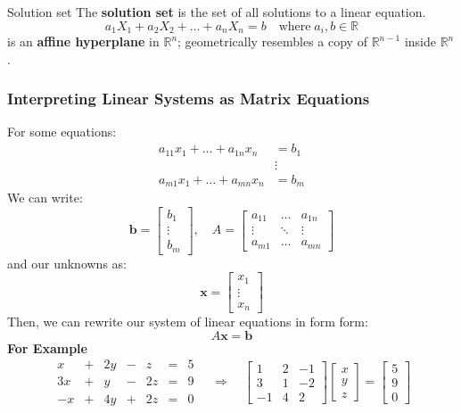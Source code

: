\documentclass[a4paper, 9pt]{extarticle}
\begin{document}
\begin{definitionbox}{Solution set}{}
  The \textbf{solution set} is the set of all solutions to a linear equation.
  $$a_1X_1 + a_2X_2 + \ldots + a_nX_n = b \quad \text{where} \; a_i, b \in \mathbb{R}$$
  is an \textbf{affine hyperplane} in $\mathbb{R}^n$; geometrically resembles a copy of $\mathbb{R}^{n-1}$ inside $\mathbb{R}^n$.
\end{definitionbox}
\subsubsection{Interpreting Linear Systems as Matrix Equations}
For some equations:
\begin{align*}
  a_{11}x_1 + \dots + a_{1n}x_n & = b_1  \\
                                & \vdots \\
  a_{m1}x_1 + \dots + a_{mn}x_n & = b_m
\end{align*}
We can write:
$$
  \mathbf{b} = \begin{bmatrix}
    b_1    \\
    \vdots \\
    b_m
  \end{bmatrix}, \quad
  A = \begin{bmatrix}
    a_{11} & \dots  & a_{1n} \\
    \vdots & \ddots & \vdots \\
    a_{m1} & \dots  & a_{mn}
  \end{bmatrix}
$$
and our unknowns as:
$$
  \mathbf{x} = \begin{bmatrix}
    x_1    \\
    \vdots \\
    x_n
  \end{bmatrix}
$$
Then, we can rewrite our system of linear equations in form form:
$$A\mathbf{x} = \mathbf{b}$$
\textbf{For Example}
$$
  \begin{array}{ccccccc}
    x  & + & 2y & - & z  & = & 5 \\
    3x & + & y  & - & 2z & = & 9 \\
    -x & + & 4y & + & 2z & = & 0
  \end{array}
  \quad \Rightarrow \quad
  \begin{bmatrix}
    1  & 2 & -1 \\
    3  & 1 & -2 \\
    -1 & 4 & 2
  \end{bmatrix}
  \begin{bmatrix}
    x \\
    y \\
    z
  \end{bmatrix}
  =
  \begin{bmatrix}
    5 \\
    9 \\
    0
  \end{bmatrix}
$$
\end{document}
